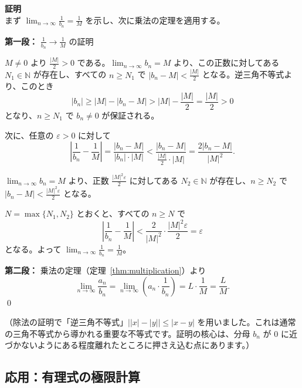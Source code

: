 \documentclass[11pt,a4paper]{jsarticle}
\theoremstyle{definition}
\newcommand{\N}{\mathbb{N}}
\newcommand{\eps}{\varepsilon}
\newcommand{\kaisetsu}[1]{\textcolor{darkblue!70!black}{\small（#1）}}
\begin{document}
\begin{proofbox}
\textbf{証明}\ \\
\noindent
まず $\lim_{n \to \infty} \frac{1}{b_n} = \frac{1}{M}$ を示し、次に乗法の定理を適用する。

\textbf{第一段：} $\frac{1}{b_n} \to \frac{1}{M}$ の証明

$M \neq 0$ より $\frac{|M|}{2} > 0$ である。$\lim_{n \to \infty} b_n = M$ より、この正数に対してある $N_1 \in \N$ が存在し、すべての $n \geq N_1$ で $|b_n - M| < \frac{|M|}{2}$ となる。逆三角不等式より、このとき
\[
|b_n| \geq |M| - |b_n - M| > |M| - \frac{|M|}{2} = \frac{|M|}{2} > 0
\]
となり、$n \geq N_1$ で $b_n \neq 0$ が保証される。

次に、任意の $\eps > 0$ に対して
\[
\left|\frac{1}{b_n} - \frac{1}{M}\right|
= \frac{|b_n - M|}{|b_n| \cdot |M|}
< \frac{|b_n - M|}{\frac{|M|}{2} \cdot |M|}
= \frac{2|b_n - M|}{|M|^2}.
\]

$\lim_{n \to \infty} b_n = M$ より、正数 $\frac{|M|^2 \eps}{2}$ に対してある $N_2 \in \N$ が存在し、$n \geq N_2$ で $|b_n - M| < \frac{|M|^2 \eps}{2}$ となる。

$N = \max\{N_1, N_2\}$ とおくと、すべての $n \geq N$ で
\[
\left|\frac{1}{b_n} - \frac{1}{M}\right|
< \frac{2}{|M|^2} \cdot \frac{|M|^2 \eps}{2}
= \eps
\]
となる。よって $\lim_{n \to \infty} \frac{1}{b_n} = \frac{1}{M}$。

\textbf{第二段：} 乗法の定理（定理~\ref{thm:multiplication}）より
\[
\lim_{n \to \infty} \frac{a_n}{b_n}
=
\lim_{n \to \infty} \left(a_n \cdot \frac{1}{b_n}\right)
=
L \cdot \frac{1}{M}
=
\frac{L}{M}.
\]
\qed
\end{proofbox}

\kaisetsu{除法の証明で「逆三角不等式」$\bigl||x| - |y|\bigr| \leq |x - y|$ を用いました。これは通常の三角不等式から導かれる重要な不等式です。証明の核心は、分母 $b_n$ が 0 に近づかないようにある程度離れたところに押さえ込む点にあります。}

\subsection{応用：有理式の極限計算}
\end{document}
